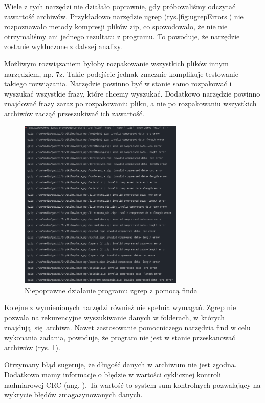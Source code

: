 Wiele z tych narzędzi nie działało poprawnie, gdy próbowaliśmy odczytać zawartość
archiwów. Przykładowo narzędzie ugrep (rys.\ref{fig:ugrepErrors}) nie rozpoznawało 
metody kompresji plików zip, co spowodowało, że nie nie otrzymaliśmy ani 
jednego rezultatu z programu. To powoduje, że narzędzie zostanie wykluczone z 
dalszej analizy.

Możliwym rozwiązaniem byłoby rozpakowanie wszystkich plików innym narzędziem, np.
7z. Takie podejście jednak znacznie komplikuje testowanie takiego rozwiązania.
Narzędzie powinno być w stanie samo rozpakować i wyszukać wszystkie frazy, które
chcemy wyszukać. Dodatkowo narzędzie powinno znajdować frazy zaraz po 
rozpakowaniu pliku, a nie po rozpakowaniu wszystkich archiwów zacząć przeszukiwać 
ich zawartość.

\begin{figure}[h]
\centering
\includegraphics[width=0.7\textwidth]{./images/zgrep-errors.png}
\caption{Niepoprawne działanie programu zgrep z pomocą finda}
\label{fig:zgrepErrors}
\end{figure}

Kolejne z wymienionych narzędzi również nie spełnia wymagań. Zgrep nie pozwala
na rekurencyjne wyszukiwanie danych w folderach, w których znajdują się archiwa.
Nawet zastosowanie pomocniczego narzędzia find w celu wykonania zadania,
powoduje, że program nie jest w stanie przeskanować archiwów (rys. \ref{fig:zgrepErrors}).

Otrzymany błąd sugeruje, że długość danych w archiwum nie jest zgodna. Dodatkowo
mamy informacje o błędzie w wartości cyklicznej kontroli nadmiarowej CRC
(ang. ). Ta wartość to system sum kontrolnych
pozwalający na wykrycie błędów zmagazynowanych danych.

